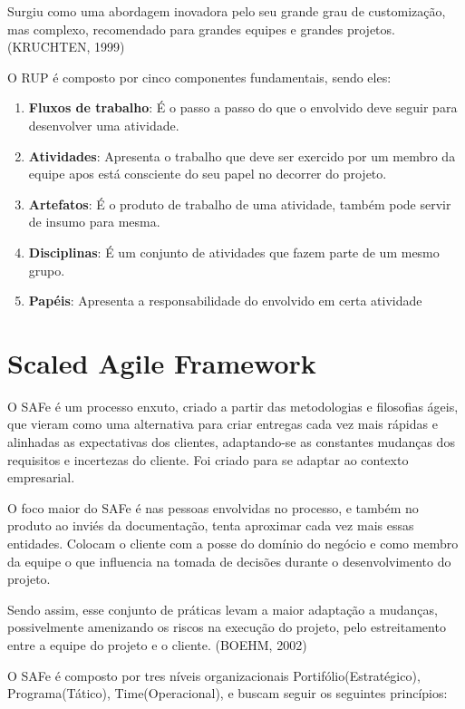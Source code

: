 Surgiu como uma abordagem inovadora pelo seu grande grau de customização, mas complexo,
recomendado para grandes equipes e grandes projetos.(KRUCHTEN, 1999)

O RUP é composto por cinco componentes fundamentais, sendo eles:

\begin{enumerate}
  \item \textbf{Fluxos de trabalho}: É o passo a passo do que o envolvido deve seguir para
  desenvolver uma atividade.
  \item \textbf{Atividades}: Apresenta o trabalho que deve ser exercido por um membro da equipe
  apos está consciente do seu papel no decorrer do projeto.
  \item \textbf{Artefatos}: É o produto de trabalho de uma atividade, também pode servir de insumo para mesma.
  \item \textbf{Disciplinas}: É um conjunto de atividades que fazem parte de um mesmo grupo.
  \item \textbf{Papéis}: Apresenta a responsabilidade do envolvido em certa atividade
\end{enumerate}

\section{Scaled Agile Framework}

O SAFe é um processo enxuto, criado a partir das metodologias e filosofias ágeis,
que vieram como uma alternativa para criar entregas cada vez mais rápidas e alinhadas
as expectativas dos clientes, adaptando-se as constantes mudanças dos requisitos
e incertezas do cliente. Foi criado para se adaptar ao contexto empresarial.

O foco maior do SAFe é nas pessoas envolvidas no processo, e também no produto ao
inviés da documentação, tenta aproximar cada vez mais essas entidades. Colocam o
cliente com a posse do domínio do negócio e como membro da equipe o que influencia
na tomada de decisões durante o desenvolvimento do projeto.

Sendo assim, esse conjunto de práticas levam a maior adaptação a mudanças, possivelmente
amenizando os riscos na execução do projeto, pelo estreitamento entre a equipe do projeto
e o cliente. (BOEHM, 2002)

O SAFe é composto por tres níveis organizacionais Portifólio(Estratégico),
Programa(Tático), Time(Operacional), e buscam seguir os seguintes princípios:

